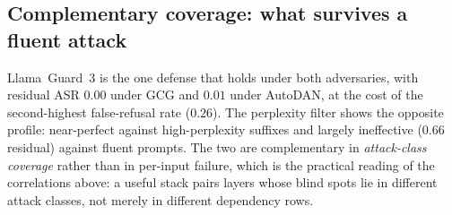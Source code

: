 \subsection{Complementary coverage: what survives a fluent attack}
\label{sec:complementary}
Llama~Guard~3 is the one defense that holds under both adversaries, with residual ASR $0.00$
under GCG and $0.01$ under AutoDAN, at the cost of the second-highest false-refusal rate
($0.26$). The perplexity filter shows the opposite profile: near-perfect against
high-perplexity suffixes and largely ineffective ($0.66$ residual) against fluent prompts.
The two are complementary in \emph{attack-class coverage} rather than in per-input failure,
which is the practical reading of the correlations above: a useful stack pairs layers whose
blind spots lie in different attack classes, not merely in different dependency rows.

